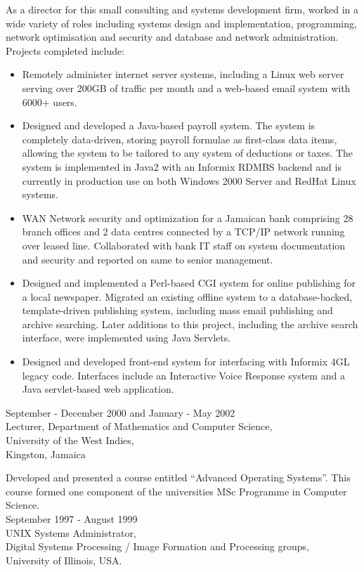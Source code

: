 \documentclass{article}[10]
\begin{document}
As a director for this small consulting and systems development firm, worked in a wide variety of roles including systems design and implementation, programming, network optimisation and security and database and network administration.  Projects completed include:
\begin{itemize}
\item Remotely administer internet server systems, including a Linux web server serving over 200GB of traffic per month and a web-based email system with 6000+ users.
\item Designed and developed a Java-based payroll system.  The system is completely data-driven, storing payroll formulae as first-class data items, allowing the system to be tailored to any system of deductions or taxes.  The system is implemented in Java2 with an Informix RDMBS backend and is currently in production use on both Windows 2000 Server and RedHat Linux systems.
\item WAN Network security and optimization for a Jamaican bank comprising 28 branch offices and 2 data centres connected by a TCP/IP network running over leased line.  Collaborated with bank IT staff on system documentation and security and reported on same to senior management.
\item Designed and implemented a Perl-based CGI system for online publishing for a local newspaper.  Migrated an existing offline system to a database-backed, template-driven publishing system, including mass email publishing and archive searching.  Later additions to this project, including the archive search interface, were implemented using Java Servlets.
\item Designed and developed front-end system for interfacing with Informix 4GL legacy code.  Interfaces include an Interactive Voice Response system and a Java servlet-based web application.
\end{itemize}

\noindent September - December 2000 and January - May 2002\\
Lecturer, Department of Mathematics and Computer Science,
\\University of the West Indies,\\
Kingston, Jamaica

Developed and presented a course entitled ``Advanced Operating Systems''.  This course formed one component of the universities MSc Programme in Computer Science.\\

\noindent September 1997 - August 1999\\
UNIX Systems Administrator,\\
Digital Systems Processing / Image Formation and Processing groups,\\
University of Illinois, USA.
\end{document}
